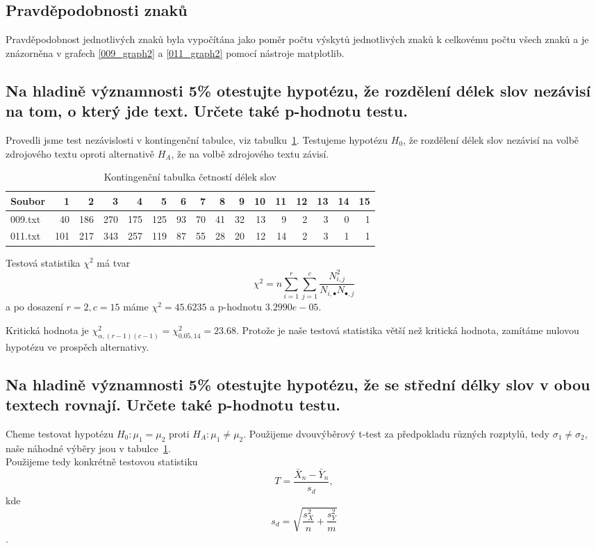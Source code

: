 \documentclass[12pt]{article}
\begin{document}
				\subsection{Pravděpodobnosti znaků}\label{pz}
			 Pravděpodobnost jednotlivých znaků byla vypočítána jako poměr počtu výskytů jednotlivých znaků k celkovému počtu všech znaků a je znázorněna v grafech \ref{009_graph2} a \ref{011_graph2} pomocí nástroje matplotlib.
						

    \subsection{Na hladině významnosti 5\% otestujte hypotézu, že rozdělení délek slov nezávisí na tom, o který jde
    text. Určete také p-hodnotu testu.} \label{ukol3}
		
   Provedli jsme test nezávislosti v kontingenční tabulce, viz tabulku~\ref{Cont_table1}. Testujeme hypotézu $H_0$, že rozdělení délek slov nezávisí na volbě zdrojového textu oproti alternativě $H_A$, že na volbě zdrojového textu závisí. \\
   
   \begin{table}[!ht]
    \centering
    \begin{tabular}{|l|rrrrrrrrrrrrrrr|} \hline
Soubor &  1  &   2  &   3  &   4  &   5  &  6  &  7  &  8  &  9  &  10 &  11 &  12 &  13 & 14 & 15 \\ \hline
009.txt &  40 &  186 &  270 &  175 &  125 &  93 &  70 &  41 &  32 &  13 &   9 &   2 &   3 & 0 &  1 \\ \hline
011.txt &  101 &  217 &  343 &  257 &  119 &  87 &  55 &  28 &  20 &  12 &  14 &   2 &   3 &   1 &   1 \\ \hline

\end{tabular}
\caption{Kontingenční tabulka četností délek slov}
\label{Cont_table1}
\end{table}

Testová statistika $\chi^2$ má tvar
$$\chi^2 = n\sum_{i =1}^r\sum_{j=1}^c \frac{N_{i,j}^2}{N_{i, \bullet}N_{\bullet, j}}$$
a po dosazení $r=2, c=15$ máme $\chi^2 = 45.6235$ a p-hodnotu $3.2990e-05$.

Kritická hodnota je $\chi^2_{\alpha, (r-1)(c-1)} = \chi^2_{0.05, 14} = 23.68$. Protože je naše testová statistika větší než kritická hodnota, zamítáme nulovou hypotézu ve prospěch alternativy.

\subsection{Na hladině významnosti 5\% otestujte hypotézu, že se střední délky slov v obou textech rovnají. Určete také p-hodnotu testu.}
Cheme testovat hypotézu $H_0: \mu_1 = \mu_2$ proti $H_A: \mu_1 \neq \mu_2$. Použijeme dvouvýběrový t-test za předpokladu
různých rozptylů, tedy $\sigma_1 \neq \sigma_2$, naše náhodné výběry jsou v tabulce~\ref{Cont_table1}.\\
Použijeme tedy konkrétně testovou statistiku 
$$T = \frac{\bar{X}_n - \bar{Y}_n}{s_d},$$
kde
$$s_d = \sqrt{\frac{s_X^2}{n}+\frac{s_Y^2}{m}}$$.
\end{document}
